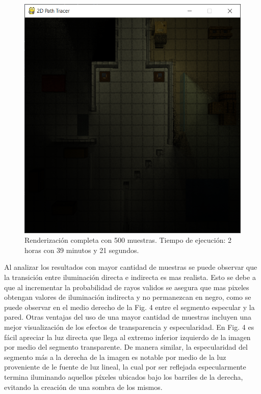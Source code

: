 \documentclass[conference]{IEEEtran}
\begin{document}
\begin{figure}[htbp]
\centerline{\includegraphics[scale=0.68]{Imagenes/Complete Lighting (500 Samples)}}
\caption{Renderización completa con 500 muestras. Tiempo de ejecución: 2 horas con 39 minutos y 21 segundos.}
\label{500 muestras completo}
\end{figure}

Al analizar los resultados con mayor cantidad de muestras se puede observar que la transición entre iluminación directa e indirecta es mas realista. Esto se debe a que al incrementar la probabilidad de rayos validos se asegura que mas pixeles obtengan valores de iluminación indirecta y no permanezcan en negro, como se puede observar en el medio derecho de la Fig. 4 entre el segmento especular y la pared. Otras ventajas del uso de una mayor cantidad de muestras incluyen una mejor visualización de los efectos de transparencia y especularidad. En Fig. 4 es fácil apreciar la luz directa que llega al extremo inferior izquierdo de la imagen por medio del segmento transparente. De manera similar, la especularidad del segmento más a la derecha de la imagen es notable por medio de la luz proveniente de le fuente de luz lineal, la cual por ser reflejada especularmente termina iluminando aquellos píxeles ubicados bajo los barriles de la derecha, evitando la creación de una sombra de los mismos.
\end{document}
